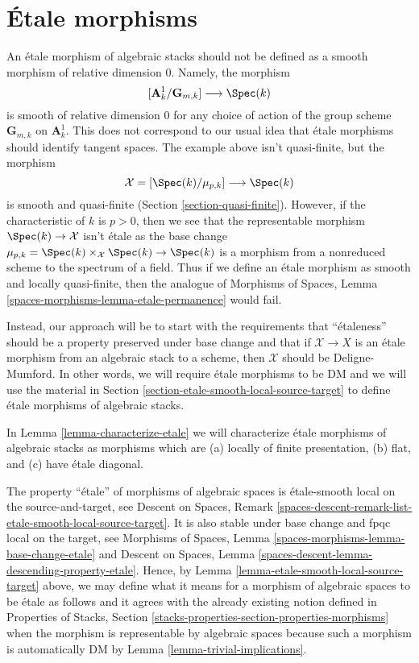 \section{\'Etale morphisms}
\label{section-etale}

\noindent
An \'etale morphism of algebraic stacks should not be defined as a
smooth morphism of relative dimension $0$. Namely, the morphism
$$
[\mathbf{A}^1_k/\mathbf{G}_{m, k}] \longrightarrow \Spec(k)
$$
is smooth of relative dimension $0$ for any choice of action
of the group scheme $\mathbf{G}_{m, k}$ on $\mathbf{A}^1_k$.
This does not correspond to our usual idea that \'etale morphisms
should identify tangent spaces. The example above isn't quasi-finite,
but the morphism
$$
\mathcal{X} = [\Spec(k)/\mu_{p, k}] \longrightarrow \Spec(k)
$$
is smooth and quasi-finite (Section \ref{section-quasi-finite}).
However, if the characteristic of $k$ is $p > 0$, then we see
that the representable morphism $\Spec(k) \to \mathcal{X}$
isn't \'etale as the base change
$\mu_{p, k} = \Spec(k) \times_\mathcal{X} \Spec(k) \to \Spec(k)$
is a morphism from a nonreduced scheme to the spectrum of a field.
Thus if we define an \'etale morphism as smooth and locally quasi-finite,
then the analogue of Morphisms of Spaces, Lemma
\ref{spaces-morphisms-lemma-etale-permanence} would fail.

\medskip\noindent
Instead, our approach will be to start with the requirements that
``\'etaleness'' should be a property preserved under base change and that if
$\mathcal{X} \to X$ is an \'etale morphism from an algebraic stack
to a scheme, then $\mathcal{X}$ should be Deligne-Mumford.
In other words, we will require \'etale morphisms to be DM and
we will use the material in
Section \ref{section-etale-smooth-local-source-target} to define
\'etale morphisms of algebraic stacks.

\medskip\noindent
In Lemma \ref{lemma-characterize-etale} we will characterize
\'etale morphisms of algebraic stacks as morphisms which are
(a) locally of finite presentation,
(b) flat, and (c) have \'etale diagonal.

\medskip\noindent
The property ``\'etale'' of morphisms of algebraic spaces
is \'etale-smooth local on the source-and-target, see
Descent on Spaces, Remark
\ref{spaces-descent-remark-list-etale-smooth-local-source-target}.
It is also stable under base change and fpqc local on the target, see
Morphisms of Spaces,
Lemma \ref{spaces-morphisms-lemma-base-change-etale}
and
Descent on Spaces,
Lemma \ref{spaces-descent-lemma-descending-property-etale}.
Hence, by
Lemma \ref{lemma-etale-smooth-local-source-target}
above, we may define what it means for a morphism of algebraic spaces
to be \'etale as follows and it agrees with the already existing notion
defined in Properties of Stacks, Section
\ref{stacks-properties-section-properties-morphisms}
when the morphism is representable by algebraic spaces
because such a morphism is automatically DM by
Lemma \ref{lemma-trivial-implications}.

